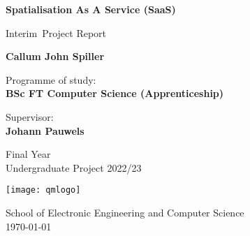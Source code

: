 
\newcommand{\reportversion}{Interim}
\hypersetup{pageanchor=false}
\begin{titlepage}
    \begin{center}
        \vspace*{1cm}

        \huge
        \textbf{Spatialisation As A Service (SaaS)}

        \vspace{0.5cm}

        \large
        \reportversion~Project Report

        \vspace{1.5cm}

        \LARGE
        \textbf{Callum John Spiller}

        \vspace{1.5cm}

        \small
        Programme of study:\\
        \textbf{BSc FT Computer Science (Apprenticeship)}

        \vspace{1cm}

        Supervisor:\\
        \textbf{Johann Pauwels}

        \vfill

        \footnotesize
        Final Year\\
        Undergraduate Project 2022/23

        \vspace{0.5cm}
        \texttt{[image: qmlogo]}
        \vspace{0.5cm}

        School of Electronic Engineering and Computer Science\\
        \today

    \end{center}
\end{titlepage}